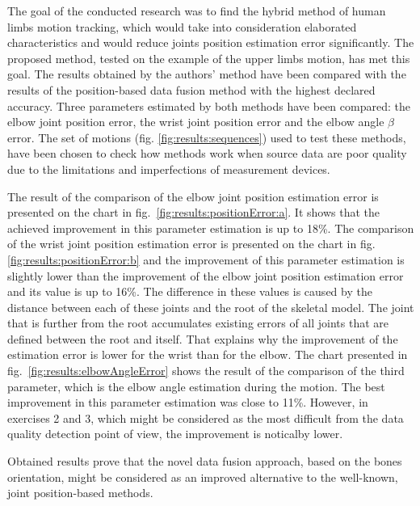 \documentclass[sensors,article,submit,moreauthors,pdftex,10pt,a4paper]{mdpi}
\begin{document}
	The goal of the conducted research was to find the hybrid method of human limbs motion tracking, which would take into consideration elaborated characteristics and would reduce joints position estimation error significantly. The proposed method, tested on the example of the upper limbs motion, has met this goal. The results obtained by the authors' method have been compared with the results of the position-based data fusion method with the highest declared accuracy. Three parameters estimated by both methods have been compared: the elbow joint position error, the wrist joint position error and the elbow angle $\beta$ error. The set of motions (fig. \ref{fig:results:sequences}) used to test these methods, have been chosen to check how methods work when source data are poor quality due to the limitations and imperfections of measurement devices.
	
	The result of the comparison of the elbow joint position estimation error is presented on the chart in fig.~\ref{fig:results:positionError:a}. It shows that the achieved improvement in this parameter estimation is up to 18\%. The comparison of the wrist joint position estimation error is presented on the chart in fig. \ref{fig:results:positionError:b} and the improvement of this parameter estimation is slightly lower than the improvement of the elbow joint position estimation error and its value is up to 16\%. The difference in these values is caused by the distance between each of these joints and the root of the skeletal model. The joint that is further from the root accumulates existing errors of all joints that are defined between the root and itself. That explains why the improvement of the estimation error is lower for the wrist than for the elbow. The chart presented in fig.~\ref{fig:results:elbowAngleError} shows the result of the comparison of the third parameter, which is the elbow angle estimation during the motion. The best improvement in this parameter estimation was close to 11\%. However, in exercises 2 and 3, which might be considered as the most difficult from the data quality detection point of view, the improvement is noticalby lower.
	
	Obtained results prove that the novel data fusion approach, based on the bones orientation, might be considered as an improved alternative to the well-known, joint position-based methods.
		
		
	\vspace{6pt} 
		
		
\end{document}

